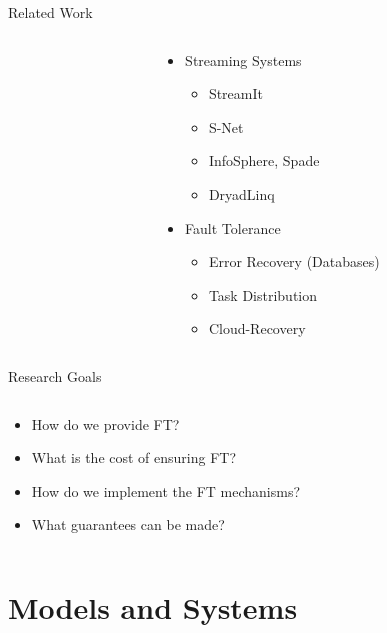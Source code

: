 \documentclass{beamer}
\begin{document}
\begin{frame}{Related Work}
\begin{columns}
\begin{column}{5cm}
\end{column}
\begin{column}{5cm}
\begin{itemize}
	\item Streaming Systems
		\begin{itemize}
			\item StreamIt \cite{thies10}
			\item S-Net \cite{pen09}
			\item InfoSphere, Spade \cite{ged08}
			\item DryadLinq \cite{yu08}
		\end{itemize}
	\item Fault Tolerance
		\begin{itemize}
			\item Error Recovery (Databases) \cite{dbrec}
			\item Task Distribution \cite{lit07}
			\item Cloud-Recovery \cite{ree06}
		\end{itemize}
\end{itemize}
\end{column}
\end{columns}
\end{frame}

\begin{frame}{Research Goals}
\begin{columns}
\begin{column}{5cm}
\begin{itemize}
	\item How do we provide FT?
	\item What is the cost of ensuring FT?
	\item How do we implement the FT mechanisms?
	\item What guarantees can be made?
\end{itemize}
\end{column}
\begin{column}{5cm}
\end{column}
\end{columns}
\end{frame}

\section{Models and Systems}
\end{document}
